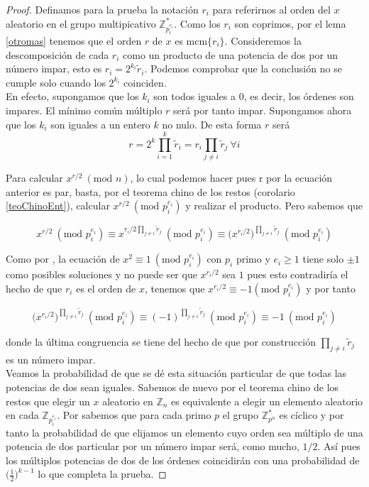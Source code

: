 \documentclass[11pt, spanish]{report}
\numberwithin{equation}{section}
\numberwithin{defin}{section}
\begin{document}
\begin{proof}
Definamos para la prueba la notación $r_i$ para referirnos al orden del $x$ aleatorio en el grupo multipicativo $\mathbb{Z}_{p_i^{e_i}}^*$. Como los $r_i$ son coprimos, por el lema \ref{otromas} tenemos que el orden $r$ de $x$ es $\text{mcm}\{r_i\}$. Consideremos la descomposición de cada $r_i$ como un producto de una potencia de dos por un número impar, esto es $r_i=2^{k_i}\tilde{r}_i$.  Podemos comprobar que la conclusión no se cumple solo cuando los $2^{k_i}$ coinciden.\\

En efecto, supongamos que los $k_i$ son todos iguales a $0$, es decir, los órdenes son impares. El mínimo común múltiplo $r$ será por tanto impar. Supongamos ahora que los $k_i$ son iguales a un entero $k$ no nulo. De esta forma $r$ será 
\begin{equation}
r=2^k\prod_{i=1}^k \tilde{r}_i = r_i\prod_{j\neq i}\tilde{r}_j\ \forall i
\end{equation} 

Para calcular $x^{r/2}\ (\text{mod }n)$, lo cual podemos hacer pues r por la ecuación anterior es par, basta, por el teorema chino de los restos (corolario \ref{teoChinoEnt}), calcular $x^{r/2}\ (\text{mod }p_i^{e_i})$ y realizar el producto. Pero sabemos que 

\begin{equation}
x^{r/2}\ (\text{mod }p_i^{e_i})\equiv x^{r_i/2\prod_{j\neq i}\tilde{r}_j}\ (\text{mod }p_i^{e_i})\equiv \Big(x^{r_i/2}\Big)^{\prod_{j\neq i}\tilde{r}_j}\ (\text{mod }p_i^{e_i})
\end{equation}

Como por \cite{cosasOrden}, la ecuación de $x^2\equiv 1\ (\text{mod }p_i^{e_i})$ con $p_i$ primo y $e_i\geq 1$ tiene solo $\pm 1$ como posibles soluciones y no puede ser que $x^{r_i/2}$ sea $1$ pues esto contradiría el hecho de que $r_i$ es el orden de $x$, tenemos que $x^{r_i/2}\equiv -1 (\text{mod }p_i^{e_i})$ y por tanto 

\begin{equation}
\Big(x^{r_i/2}\Big)^{\prod_{j\neq i}\tilde{r}_j}\ (\text{mod }p_i^{e_i})\equiv (-1)^{\prod_{j\neq i}\tilde{r}_j}\ (\text{mod }p_i^{e_i})\equiv -1\ (\text{mod }p_i^{e_i})
\end{equation}

donde la última congruencia se tiene del hecho de que por construcción $\prod_{j\neq i}\tilde{r}_j$ es un número impar.\\

Veamos la probabilidad de que se dé esta situación particular de que todas las potencias de dos sean iguales. Sabemos de nuevo por el teorema chino de los restos que elegir un $x$ aleatorio en $\mathbb{Z}_n$ es equivalente a elegir un elemento aleatorio en cada $\mathbb{Z}_{p_i^{e_i}}$. Por \cite{knuth1968art2} sabemos que para cada primo $p$ el grupo $\mathbb{Z}_{p^\alpha}^*$ es cíclico y por tanto la probabilidad de que elijamos un elemento cuyo orden sea múltiplo de una potencia de dos particular por un número impar será, como mucho, $1/2$. Así pues los múltiplos potencias de dos de los órdenes coincidirán con una probabilidad de $\Big(\frac{1}{2}\Big)^{k-1}$ lo que completa la prueba. 
\end{proof}
\end{document}

